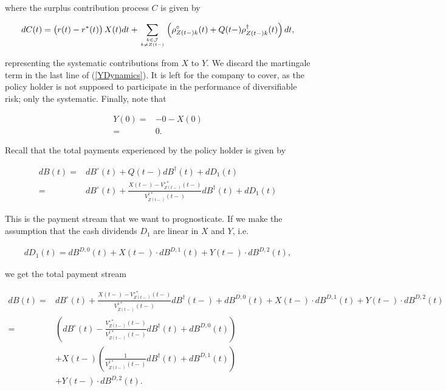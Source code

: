 \documentclass{book}
\newcommand{\1}[1]{\mathbbm{1}_{\left\lbrace #1 \right\rbrace}}
\theoremstyle{break}
\theoremstyle{remark}
\numberwithin{equation}{section}
\begin{document}
 where the surplus contribution process $C$ is given by

\begin{align*}
	dC(t) = \left( r(t) - r^*(t) \right) X(t) dt + \sum_{k \in \mathcal{J} \atop k \neq Z(t-)} \left( \rho_{Z(t-)k}^\circ(t) + Q(t-) \rho_{Z(t-)k}^\dagger(t) \right) dt,
\end{align*}

representing the systematic contributions from $X$ to $Y$. We discard the martingale term in the last line of (\ref{YDynamics}). It is left for the company to cover, as the policy holder is not supposed to participate in the performance of diversifiable risk; only the systematic. Finally, note that

\begin{align*}
	Y(0) =& - 0 - X(0) \\
	=& 0.
\end{align*}

Recall that the total payments experienced by the policy holder is given by

\begin{align*}
dB(t) =& dB^\circ(t) + Q(t-) dB^\dagger(t) + dD_1(t)\\
=& dB^\circ(t) + \frac{X(t-) - V_{Z(t-)}^{\circ*}(t-)}{V_{Z(t-)}^{\dagger*}(t-)} dB^\dagger(t) + dD_1(t)
\end{align*}

This is the payment stream that we want to prognosticate. If we make the assumption that the cash dividends $D_1$ are linear in $X$ and $Y$, i.e.

\begin{align} \label{LinearCashDiv}
dD_1(t) = dB^{D,0}(t) + X(t-) \cdot dB^{D,1}(t) + Y(t-) \cdot dB^{D,2}(t),
\end{align}

we get the total payment stream

\begin{align}
dB(t) =& dB^\circ(t) + \frac{X(t-) - V_{Z(t-)}^{\circ*}(t-)}{V_{Z(t-)}^{\dagger*}(t-)} dB^\dagger(t-) + dB^{D,0}(t) + X(t-) \cdot dB^{D,1}(t) + Y(t-) \cdot dB^{D,2}(t) \nonumber \\
=& \left( dB^\circ(t) - \frac{V_{Z(t-)}^{\circ*}(t-)}{V_{Z(t-)}^{\dagger*}(t-)} dB^\dagger(t) + dB^{D,0}(t) \right) \label{FirstLine} \\
&+ X(t-) \left( \frac{1}{V_{Z(t-)}^{\dagger*}(t-)} dB^\dagger(t) + dB^{D,1}(t) \right) \label{SecondLine} \\
&+ Y(t-) \cdot dB^{D,2}(t). \label{ThirdLine}
\end{align}
\end{document}
